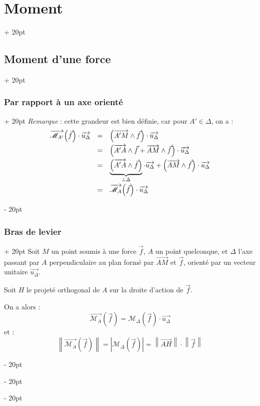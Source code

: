 \documentclass[a4paper, 12pt, twoside]{article}
\newcommand{\vect}{\overrightarrow}
\newcommand{\lr}[1]{\left( #1 \right)}
\newcommand{\abs}[1]{\left\lvert #1 \right\rvert}
\newcommand{\norm}[1]{\left\lVert #1 \right\rVert}
\newcommand{\ind}[1][20pt]{\advance\leftskip + #1}
\newcommand{\deind}[1][20pt]{\advance\leftskip - #1}
\newenvironment{indt}[2][20pt]{#2 \par \ind[#1]}{\par \deind} %
\begin{document}
\begin{indt}{\section{Moment}}
\begin{indt}{\subsection{Moment d'une force}}
\begin{indt}{\subsubsection{Par rapport à un axe orienté}}
                \textit{Remarque} : cette grandeur est bien définie, car pour $A' \in \Delta$, on a :
                \[
                    \begin{array}{rcl}
                        \vect{\mathscr M_{A'}}\!\lr{\vec f} \cdot \vect{u_\Delta}
                        &=& \lr{\vect{A'M} \wedge \vec f} \cdot \vect{u_\Delta}
                        \vspace{3pt}
                        \\
                        &=& \lr{\vect{A'A} \wedge \vec f + \vect{AM} \wedge \vec f} \cdot \vect{u_\Delta}
                        \vspace{3pt}
                        \\
                        &=& \underbrace{\lr{\vect{A'A} \wedge \vec f}}_{\perp \Delta} \cdot \vect{u_\Delta} + \lr{\vect{AM} \wedge \vec f} \cdot \vect{u_\Delta}
                        \vspace{3pt}
                        \\
                        &=& \vect{\mathscr M_A}\!\lr{\vec f} \cdot \vect{u_\Delta}
                    \end{array}
                \]
            \end{indt}

            \vspace{12pt}
            
            \begin{indt}{\subsubsection{Bras de levier}}
                Soit $M$ un point soumis à une force $\vec f$, $A$ un point quelconque, et $\Delta$ l'axe passant par $A$ perpendiculaire au plan formé par $\vect{AM}$ et $\vec f$, orienté par un vecteur unitaire $\vect{u_\Delta}$.
                
                Soit $H$ le projeté orthogonal de $A$ sur la droite d'action de $\vec f$.

                \vspace{6pt}
                
                On a alors :
                \[
                    \vect{\mathscr M_A}\!\lr{\vec f} = \mathscr M_\Delta\!\lr{\vec f} \cdot \vect{u_\Delta}
                \]
                et :
                \[
                    \norm{\vect{\mathscr M_A}\!\lr{\vec f}} = \abs{\mathscr M_\Delta\!\lr{\vec f}}
                    = \norm{\vect{AH}} \cdot \norm{\vec f}
                \]


\end{indt}
\end{indt}
\end{indt}
\end{document}
